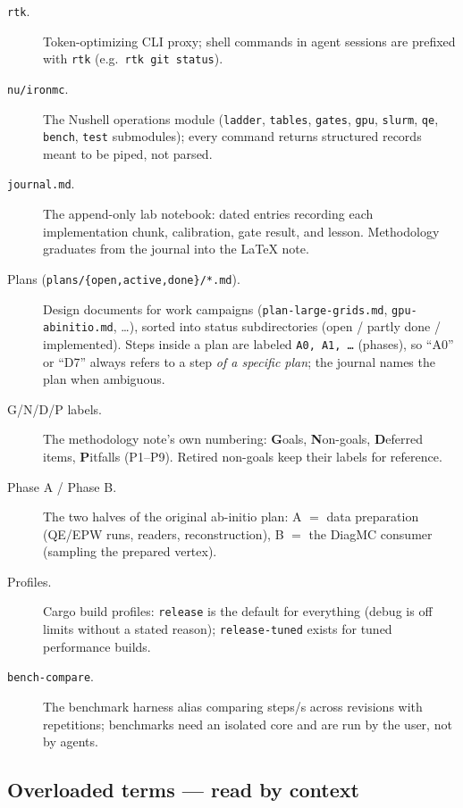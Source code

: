 \documentclass[11pt]{article}
\newcommand{\term}[1]{\item[#1.]}
\begin{document}
\begin{description}
\term{\texttt{rtk}} Token-optimizing CLI proxy; shell commands in agent sessions are
  prefixed with \texttt{rtk} (e.g.\ \texttt{rtk git status}).

\term{\texttt{nu/ironmc}} The Nushell operations module (\texttt{ladder},
  \texttt{tables}, \texttt{gates}, \texttt{gpu}, \texttt{slurm}, \texttt{qe},
  \texttt{bench}, \texttt{test} submodules); every command returns structured records
  meant to be piped, not parsed.

\term{\texttt{journal.md}} The append-only lab notebook: dated entries recording each
  implementation chunk, calibration, gate result, and lesson. Methodology graduates
  from the journal into the LaTeX note.

\term{Plans (\texttt{plans/\{open,active,done\}/*.md})} Design documents for work
  campaigns (\texttt{plan-large-grids.md}, \texttt{gpu-abinitio.md}, \dots), sorted into
  status subdirectories (open / partly done / implemented). Steps inside a
  plan are labeled \texttt{A0, A1, \dots} (phases), so ``A0'' or ``D7'' always refers
  to a step \emph{of a specific plan}; the journal names the plan when ambiguous.

\term{G/N/D/P labels} The methodology note's own numbering: \textbf{G}oals,
  \textbf{N}on-goals, \textbf{D}eferred items, \textbf{P}itfalls (P1--P9). Retired
  non-goals keep their labels for reference.

\term{Phase A / Phase B} The two halves of the original ab-initio plan: A $=$
  data preparation (QE/EPW runs, readers, reconstruction), B $=$ the DiagMC consumer
  (sampling the prepared vertex).

\term{Profiles} Cargo build profiles: \texttt{release} is the default for everything
  (debug is off limits without a stated reason); \texttt{release-tuned} exists for
  tuned performance builds.

\term{\texttt{bench-compare}} The benchmark harness alias comparing steps/s across
  revisions with repetitions; benchmarks need an isolated core and are run by the
  user, not by agents.
\end{description}

\subsection{Overloaded terms --- read by context}
\label{sec:overloaded}
\end{document}
